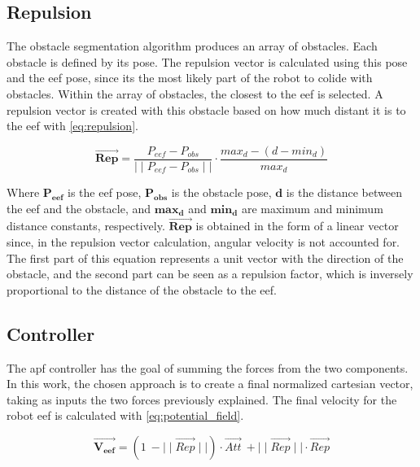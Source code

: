 \subsection{Repulsion}
\label{ssec:repulsion}

\par The obstacle segmentation algorithm produces an array of obstacles. Each obstacle is defined by its pose. The repulsion vector is calculated using this pose and the \ac{eef} pose, since its the most likely part of the robot to colide with obstacles. Within the array of obstacles, the closest to the \ac{eef} is selected. A repulsion vector is created with this obstacle based on how much distant it is to the \ac{eef} with \autoref{eq:repulsion}.

\begin{equation}
    \vec{\mathbf{Rep}} = \frac{P_{eef}-P_{obs}}{\mid\mid P_{eef}-P_{obs} \mid\mid}\cdot\frac{max_d-(d-min_d)}{max_d} 
    \label{eq:repulsion}
\end{equation}

\noindent Where $\mathbf{P_{eef}}$ is the \ac{eef} pose, $\mathbf{P_{obs}}$ is the obstacle pose, $\mathbf{d}$ is the distance between the \ac{eef} and the obstacle, and $\mathbf{max_d}$ and $\mathbf{min_d}$ are maximum and minimum distance constants, respectively. $\vec{\mathbf{Rep}}$ is obtained in the form of a linear vector since, in the repulsion vector calculation, angular velocity is not accounted for. The first part of this equation represents a unit vector with the direction of the obstacle, and the second part can be seen as a repulsion factor, which is inversely proportional to the distance of the obstacle to the \ac{eef}.



\subsection{Controller}

\par The \ac{apf} controller has the goal of summing the forces from the two components. In this work, the chosen approach is to create a final normalized cartesian vector, taking as inputs the two forces previously explained. The final velocity for the robot \ac{eef} is calculated with \autoref{eq:potential_field}.

\begin{equation}
    \vec{\mathbf{V_{eef}}}=(1\:-\mid\mid\vec{Rep}\mid\mid)\cdot\vec{Att}\:+\mid\mid\vec{Rep}\mid\mid\cdot \vec{Rep}
    \label{eq:potential_field}
\end{equation}

